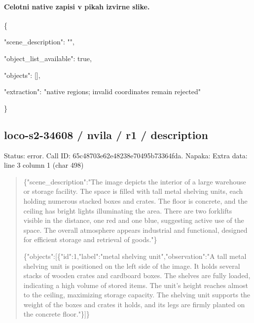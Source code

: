 \documentclass[10pt,a4paper]{article}
\begin{document}
\paragraph{Celotni native zapisi v pikah izvirne slike.}
\{\par
  "scene\_description":\allowbreak{} "",\allowbreak{}\par
  "object\_list\_available":\allowbreak{} true,\allowbreak{}\par
  "objects":\allowbreak{} [],\allowbreak{}\par
  "extraction":\allowbreak{} "native regions; invalid coordinates remain rejected"\par
\}
\subsection*{loco-s2-34608 / nvila / r1 / description}
Status: error. Call ID: 65c48703e62e48238e70495b73364fda. Napaka: Extra data: line 3 column 1 (char 498)
\begin{quote}\footnotesize
\{"scene\_description":\allowbreak{}"The image depicts the interior of a large warehouse or storage facility. The space is filled with tall metal shelving units,\allowbreak{} each holding numerous stacked boxes and crates. The floor is concrete,\allowbreak{} and the ceiling has bright lights illuminating the area. There are two forklifts visible in the distance,\allowbreak{} one red and one blue,\allowbreak{} suggesting active use of the space. The overall atmosphere appears industrial and functional,\allowbreak{} designed for efficient storage and retrieval of goods."\}\par
\par
\{"objects":\allowbreak{}[\{"id":\allowbreak{}1,\allowbreak{}"label":\allowbreak{}"met\allowbreak{}al shelving unit",\allowbreak{}"observation":\allowbreak{}"A tall metal shelving unit is positioned on the left side of the image. It holds several stacks of wooden crates and cardboard boxes. The shelves are fully loaded,\allowbreak{} indicating a high volume of stored items. The unit's height reaches almost to the ceiling,\allowbreak{} maximizing storage capacity. The shelving unit supports the weight of the boxes and crates it holds,\allowbreak{} and its legs are firmly planted on the concrete floor."\}]\}
\end{quote}
\end{document}
